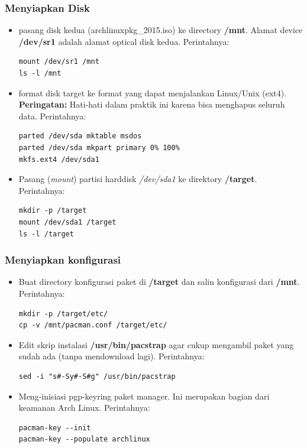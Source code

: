 \documentclass[12pt,]{article}
\begin{document}
	\subsubsection{Menyiapkan Disk}
	\begin{itemize}
		\item pasang disk kedua (archlinuxpkg\_2015.iso) ke directory \textbf{/mnt}.
		Alamat device \textbf{/dev/sr1} adalah alamat optical disk kedua.
		Perintahnya:
		\begin{verbatim}
mount /dev/sr1 /mnt
ls -l /mnt
		\end{verbatim}
		
		\item format disk target ke format yang dapat menjalankan Linux/Unix (ext4).
		\textbf{Peringatan:} Hati-hati dalam praktik ini karena bisa menghapus seluruh data.
		Perintahnya:
		\begin{verbatim}
parted /dev/sda mktable msdos
parted /dev/sda mkpart primary 0% 100%
mkfs.ext4 /dev/sda1
		\end{verbatim}
		
		\item Pasang (\textit{mount}) partisi harddisk \textit{/dev/sda1} ke direktory \textbf{/target}.
		Perintahnya:
		\begin{verbatim}
mkdir -p /target
mount /dev/sda1 /target
ls -l /target
		\end{verbatim}
	\end{itemize}	

	\subsubsection{Menyiapkan konfigurasi}
	\begin{itemize}
		\item Buat directory konfigurasi paket di \textbf{/target} dan salin konfigurasi dari \textbf{/mnt}.
		Perintahnya:
		\begin{verbatim}
mkdir -p /target/etc/
cp -v /mnt/pacman.conf /target/etc/	
		\end{verbatim}	
		
		\item Edit skrip instalasi \textbf{/usr/bin/pacstrap} agar cukup mengambil paket yang sudah ada (tanpa mendownload lagi).
		Perintahnya:
		\begin{verbatim}
sed -i "s#-Sy#-S#g" /usr/bin/pacstrap	
		\end{verbatim}
		
		\item Meng-inisiasi pgp-keyring paket manager. Ini merupakan bagian dari keamanan Arch Linux.
		Perintahnya:
		\begin{verbatim}
pacman-key --init
pacman-key --populate archlinux
		\end{verbatim}
	\end{itemize}
	
\end{document}
